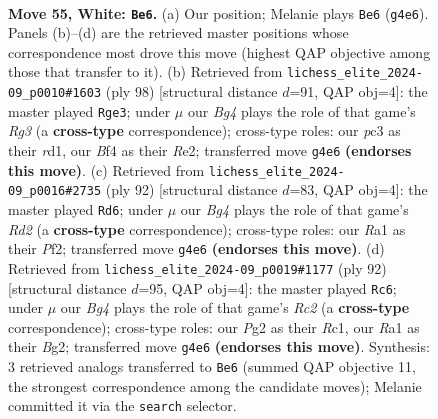 \documentclass[11pt]{article}
\begin{document}
\clearpage

\begin{figure}[p]\centering
\begin{subfigure}{0.46\textwidth}\centering
\resizebox{\linewidth}{!}{%
\newchessgame
\chessboard[
  setfen={5b1r/p4nkp/P7/3r4/5BB1/1Pp3KP/R1P3P1/R7 w - - 17 55},
  showmover=false,
  pgfstyle=straightmove, color=movearrow, markmove={g4-e6}
]}
\caption{}
\end{subfigure}\hfill
\begin{subfigure}{0.46\textwidth}\centering
\resizebox{\linewidth}{!}{%
\newchessgame
\chessboard[
  setfen={8/7p/1p3rbk/1B6/P7/6RP/4RPPK/3r4 w - - 15 50},
  showmover=false,
  pgfstyle=straightmove, color=movearrow, markmove={g3-e3}
]}
\caption{}
\end{subfigure}
\\[4pt]
\begin{subfigure}{0.46\textwidth}\centering
\resizebox{\linewidth}{!}{%
\newchessgame
\chessboard[
  setfen={5rk1/5b1p/1p6/1P3p2/1R6/7P/rB1R1PPK/8 w - - 0 47},
  showmover=false,
  pgfstyle=straightmove, color=movearrow, markmove={d2-d6}
]}
\caption{}
\end{subfigure}\hfill
\begin{subfigure}{0.46\textwidth}\centering
\resizebox{\linewidth}{!}{%
\newchessgame
\chessboard[
  setfen={2r5/2p1r3/1p1n1k2/1P1P2p1/P7/6P1/2R2PB1/2R3K1 w - - 1 47},
  showmover=false,
  pgfstyle=straightmove, color=movearrow, markmove={c2-c6}
]}
\caption{}
\end{subfigure}
\caption{\textbf{Move 55, White: \texttt{Be6}.} (a) Our position; Melanie plays \texttt{Be6} (\texttt{g4e6}). Panels (b)--(d) are the retrieved master positions whose correspondence most drove this move (highest QAP objective among those that transfer to it). (b) Retrieved from \texttt{lichess\_elite\_2024-09\_p0010\#1603} (ply 98) [structural distance $d$=91, QAP obj=4]: the master played \texttt{Rge3}; under $\mu$ our \emph{Bg4} plays the role of that game's \emph{Rg3} (a \textbf{cross-type} correspondence); cross-type roles: our \emph{p}c3 as their \emph{r}d1, our \emph{B}f4 as their \emph{R}e2; transferred move \texttt{g4e6} \textbf{(endorses this move)}. (c) Retrieved from \texttt{lichess\_elite\_2024-09\_p0016\#2735} (ply 92) [structural distance $d$=83, QAP obj=4]: the master played \texttt{Rd6}; under $\mu$ our \emph{Bg4} plays the role of that game's \emph{Rd2} (a \textbf{cross-type} correspondence); cross-type roles: our \emph{R}a1 as their \emph{P}f2; transferred move \texttt{g4e6} \textbf{(endorses this move)}. (d) Retrieved from \texttt{lichess\_elite\_2024-09\_p0019\#1177} (ply 92) [structural distance $d$=95, QAP obj=4]: the master played \texttt{Rc6}; under $\mu$ our \emph{Bg4} plays the role of that game's \emph{Rc2} (a \textbf{cross-type} correspondence); cross-type roles: our \emph{P}g2 as their \emph{R}c1, our \emph{R}a1 as their \emph{B}g2; transferred move \texttt{g4e6} \textbf{(endorses this move)}. Synthesis: 3 retrieved analogs transferred to \texttt{Be6} (summed QAP objective 11, the strongest correspondence among the candidate moves); Melanie committed it via the \texttt{search} selector.}
\label{fig:thought-m108}
\end{figure}
\end{document}
